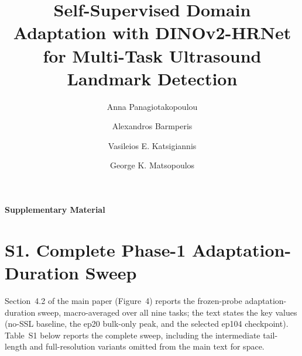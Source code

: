 \documentclass[runningheads]{llncs}
\begin{document}
\title{Self-Supervised Domain Adaptation with DINOv2-HRNet for Multi-Task Ultrasound Landmark Detection}

\author{Anna Panagiotakopoulou \and
Alexandros Barmperis \and
Vasileios E. Katsigiannis \and
George K. Matsopoulos}



\maketitle

\begin{center}
{\Large\bfseries Supplementary Material}
\end{center}

\renewcommand{\thetable}{S\arabic{table}}

\section*{S1. Complete Phase-1 Adaptation-Duration Sweep}

Section~4.2 of the main paper (Figure~4) reports the frozen-probe
adaptation-duration sweep, macro-averaged over all nine tasks; the text
states the key values (no-SSL baseline, the ep20 bulk-only peak, and the
selected ep104 checkpoint). Table~S1 below reports the complete sweep,
including the intermediate tail-length and full-resolution variants omitted
from the main text for space.
\end{document}
